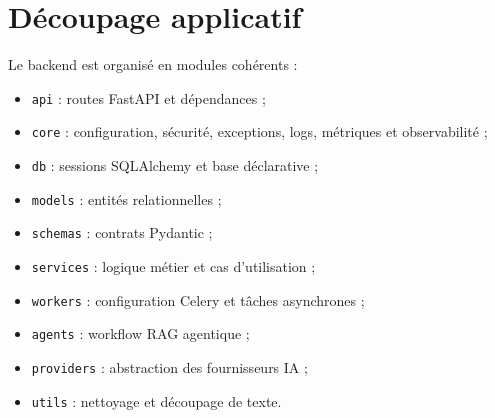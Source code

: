 \documentclass[12pt,a4paper,oneside]{report}
\begin{document}
\section{Découpage applicatif}
Le backend est organisé en modules cohérents :
\begin{itemize}
  \item \texttt{api} : routes FastAPI et dépendances ;
  \item \texttt{core} : configuration, sécurité, exceptions, logs, métriques et observabilité ;
  \item \texttt{db} : sessions SQLAlchemy et base déclarative ;
  \item \texttt{models} : entités relationnelles ;
  \item \texttt{schemas} : contrats Pydantic ;
  \item \texttt{services} : logique métier et cas d'utilisation ;
  \item \texttt{workers} : configuration Celery et tâches asynchrones ;
  \item \texttt{agents} : workflow RAG agentique ;
  \item \texttt{providers} : abstraction des fournisseurs IA ;
  \item \texttt{utils} : nettoyage et découpage de texte.
\end{itemize}
\end{document}

